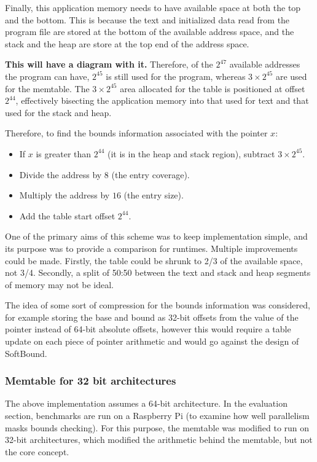 Finally, this application memory needs to have available space at both the top and the bottom.
This is because the text and initialized data read from the program file are stored at the bottom of the available address space, and the stack and the heap are store at the top end of the address space.

\textbf{This will have a diagram with it.} Therefore, of the $2^{47}$ available addresses the program can have, $2^{45}$ is still used for the program, whereas $3\times 2^{45}$ are used for the memtable.
The $3\times 2^{45}$ area allocated for the table is positioned at offset $2^{44}$, effectively bisecting the application memory into that used for text and that used for the stack and heap.

Therefore, to find the bounds information associated with the pointer $x$:

\begin{itemize}
\item If $x$ is greater than $2^{44}$ (it is in the heap and stack region), subtract $3\times 2^{45}$.
\item Divide the address by $8$ (the entry coverage).
\item Multiply the address by $16$ (the entry size).
\item Add the table start offset $2^{44}$.
\end{itemize}

One of the primary aims of this scheme was to keep implementation simple, and its purpose was to provide a comparison for runtimes.
Multiple improvements could be made.
Firstly, the table could be shrunk to 2/3 of the available space, not 3/4.
Secondly, a split of 50:50 between the text and stack and heap segments of memory may not be ideal.

The idea of some sort of compression for the bounds information was considered, for example storing the base and bound as 32-bit offsets from the value of the pointer instead of 64-bit absolute offsets, however this would require a table update on each piece of pointer arithmetic and would go against the design of SoftBound.

\subsubsection{Memtable for 32 bit architectures}

The above implementation assumes a 64-bit architecture.
In the evaluation section, benchmarks are run on a Raspberry Pi (to examine how well parallelism masks bounds checking).
For this purpose, the memtable was modified to run on 32-bit architectures, which modified the arithmetic behind the memtable, but not the core concept.

